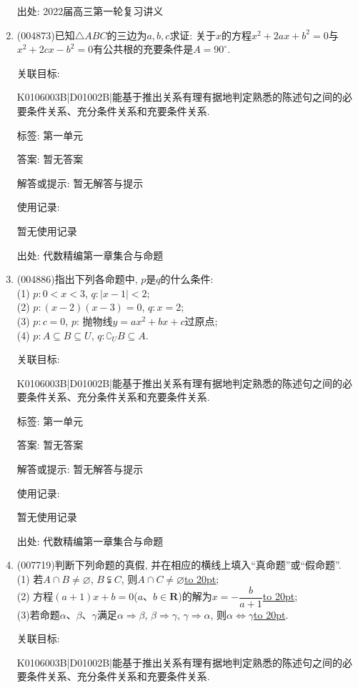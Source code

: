 \documentclass[10pt,a4paper]{article}
\newcommand{\blank}[1]{\underline{\hbox to #1pt{}}}
\begin{document}
\begin{enumerate}[1.]
出处: 2022届高三第一轮复习讲义
\item { (004873)}已知$\triangle ABC$的三边为$a,b,c$求证: 关于$x$的方程$x^2+2ax+b^2=0$与$x^2+2cx-b^2=0$有公共根的充要条件是$A=90^\circ$.


关联目标:

K0106003B|D01002B|能基于推出关系有理有据地判定熟悉的陈述句之间的必要条件关系、充分条件关系和充要条件关系.



标签: 第一单元

答案: 暂无答案

解答或提示: 暂无解答与提示

使用记录:

暂无使用记录


出处: 代数精编第一章集合与命题
\item { (004886)}指出下列各命题中, $p$是$q$的什么条件:\\
(1) $p:0<x<3$, $q:|x-1|<2$;\\
(2) $p:(x-2)(x-3)=0$, $q:x=2$;\\
(3) $p:c=0$, $p$: 抛物线$y=ax^2+bx+c$过原点;\\
(4) $p:A\subseteq B\subseteq U$, $q:\complement_UB\subseteq A$.


关联目标:

K0106003B|D01002B|能基于推出关系有理有据地判定熟悉的陈述句之间的必要条件关系、充分条件关系和充要条件关系.



标签: 第一单元

答案: 暂无答案

解答或提示: 暂无解答与提示

使用记录:

暂无使用记录


出处: 代数精编第一章集合与命题
\item { (007719)}判断下列命题的真假, 并在相应的横线上填入``真命题''或``假命题''.\\
(1) 若$A\cap B\ne \varnothing$, $B\subsetneqq C$, 则$A\cap C\ne \varnothing$\blank{20};\\
(2) 方程$(a+1)x+b=0$($a$、$b\in \mathbf{R}$)的解为$x=-\dfrac b{a+1}$\blank{20};\\
(3)若命题$\alpha$、$\beta$、$\gamma$满足$\alpha \Rightarrow \beta$, $\beta \Rightarrow \gamma$, $\gamma \Rightarrow \alpha$, 则$\alpha \Leftrightarrow \gamma$\blank{20}.


关联目标:

K0106003B|D01002B|能基于推出关系有理有据地判定熟悉的陈述句之间的必要条件关系、充分条件关系和充要条件关系.




\end{enumerate}
\end{document}
